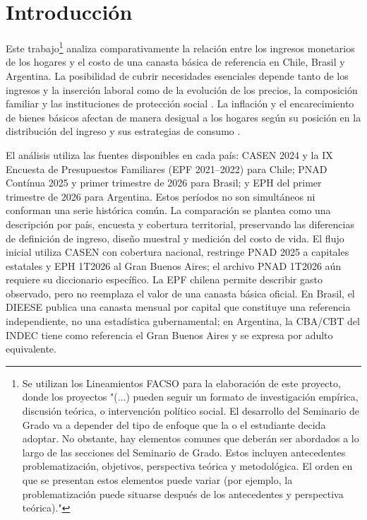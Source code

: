 \section{Introducción}

Este trabajo\footnote[1]{Se utilizan los Lineamientos FACSO para la elaboración de este proyecto, donde los proyectos "(...) pueden seguir un formato de investigación empírica, discusión teórica, o intervención político social. El desarrollo del Seminario de Grado va a depender del tipo de enfoque que la o el estudiante decida adoptar. No obstante, hay elementos comunes que deberán ser abordados a lo largo de las secciones del Seminario de Grado. Estos incluyen antecedentes problematización, objetivos, perspectiva teórica y metodológica. El orden en que se presentan estos elementos puede variar (por ejemplo, la problematización puede situarse después de los antecedentes y perspectiva teórica)."} analiza comparativamente la relación entre los ingresos monetarios de los hogares y el costo de una canasta básica de referencia en Chile, Brasil y Argentina. La posibilidad de cubrir necesidades esenciales depende tanto de los ingresos y la inserción laboral como de la evolución de los precios, la composición familiar y las instituciones de protección social \parencite{cepalPanoramaSocialAmerica2025, GindlingRonconi2025, DuranKremerman2024}. La inflación y el encarecimiento de bienes básicos afectan de manera desigual a los hogares según su posición en la distribución del ingreso y sus estrategias de consumo \parencite{Adam2025, Nessieretal2026}.

El análisis utiliza las fuentes disponibles en cada país: CASEN 2024 y la IX Encuesta de Presupuestos Familiares (EPF 2021--2022) para Chile; PNAD Contínua 2025 y primer trimestre de 2026 para Brasil; y EPH del primer trimestre de 2026 para Argentina. Estos períodos no son simultáneos ni conforman una serie histórica común. La comparación se plantea como una descripción por país, encuesta y cobertura territorial, preservando las diferencias de definición de ingreso, diseño muestral y medición del costo de vida. El flujo inicial utiliza CASEN con cobertura nacional, restringe PNAD 2025 a capitales estatales y EPH 1T2026 al Gran Buenos Aires; el archivo PNAD 1T2026 aún requiere su diccionario específico. La EPF chilena permite describir gasto observado, pero no reemplaza el valor de una canasta básica oficial. En Brasil, el DIEESE publica una canasta mensual por capital que constituye una referencia independiente, no una estadística gubernamental; en Argentina, la CBA/CBT del INDEC tiene como referencia el Gran Buenos Aires y se expresa por adulto equivalente.

